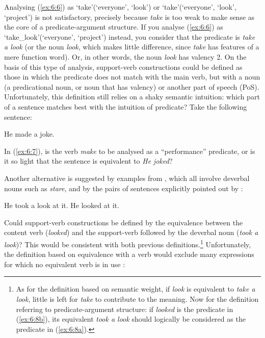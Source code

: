 \documentclass[output=paper]{langsci/langscibook}
\begin{document}
\noindent Analysing (\ref{ex:6:6}) as ‘take’(‘everyone’, ‘look’) or ‘take’(‘everyone’, ‘look’, ‘project’) is not satisfactory, precisely because \textit{take} is too weak to make sense as the core of a predicate-argument structure. If you analyse (\ref{ex:6:6}) as ‘take\_look’(‘everyone’, ‘project’) instead, you consider that the predicate is\textit{ take a look} (or the noun \textit{look}, which makes little difference, since \textit{take} has features of a mere function word). Or, in other words, the noun \textit{look} has valency 2. On the basis of this type of analysis, support-verb constructions could be defined as those in which the predicate does not match with the main verb, but with a noun (a predicational noun, or noun that has valency) or another part of speech (PoS). Unfortunately, this definition still relies on a shaky semantic intuition: which part of a sentence matches best with the intuition of predicate? Take the following sentence:


\begin{exe}
 \ex   \label{ex:6:7}
He made a joke.
\end{exe}
In (\ref{ex:6:7}), is the verb \textit{make} to be analysed as a “performance” predicate, or is it so light that the sentence is equivalent to \textit{He joked}?

Another alternative is suggested by examples from \citet{Jespersen1942}, which all involve deverbal nouns such as \textit{stare}, and by the pairs of sentences explicitly pointed out by \cite[17-19]{Harris1964}:

\begin{exe}
\ex  \begin{xlist}  
 \ex \label{ex:6:8a}
 He took a look at it.
 \ex \label{ex:6:8b}
 He looked at it.
 \end{xlist}
 \end{exe}

\noindent Could support-verb constructions be defined by the equivalence between the content verb (\textit{looked}) and the support-verb followed by the deverbal noun (\textit{took a look})? This would be consistent with both previous definitions.\footnote{ As for the definition based on semantic weight, if \textit{look} is equivalent to \textit{take a look}, little is left for \textit{take} to contribute to the meaning. Now for the definition referring to predicate-argument structure: if \textit{looked} is the predicate in (\ref{ex:6:8b}), its equivalent \textit{took a look} should logically be considered as the predicate in (\ref{ex:6:8a}).} Unfortunately, the definition based on equivalence with a verb would exclude many expressions for which no equivalent verb is in use \citep{Labelle1974}: 
\end{document}
